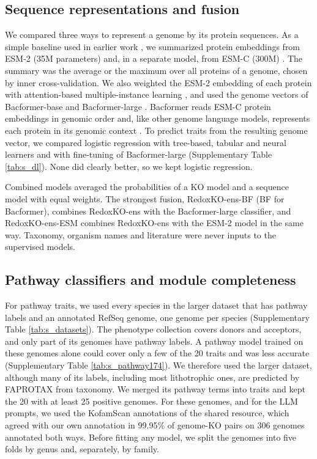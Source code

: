 \documentclass[10pt,a4paper,onecolumn]{article}
\begin{document}
\subsection{Sequence representations and
fusion}\label{sequence-representations-and-fusion}

We compared three ways to represent a genome by its protein sequences.
As a simple baseline used in earlier work \autocite{Hwang2024}, we
summarized protein embeddings from ESM-2 (35M parameters)
\autocite{Lin2023} and, in a separate model, from ESM-C (300M)
\autocite{EvolutionaryScale2024}. The summary was the average or the
maximum over all proteins of a genome, chosen by inner cross-validation.
We also weighted the ESM-2 embedding of each protein with
attention-based multiple-instance learning \autocite{Ilse2018}, and used
the genome vectors of Bacformer-base and Bacformer-large
\autocite{Wiatrak2025}. Bacformer reads ESM-C protein embeddings in
genomic order and, like other genome language models, represents each
protein in its genomic context \autocite{Hwang2024,Nguyen2024}. To
predict traits from the resulting genome vector, we compared logistic
regression with tree-based, tabular and neural learners and with
fine-tuning of Bacformer-large (Supplementary Table \ref{tab:s_dl}).
None did clearly better, so we kept logistic regression.

Combined models averaged the probabilities of a KO model and a sequence
model with equal weights. The strongest fusion, RedoxKO-ens-BF (BF for
Bacformer), combines RedoxKO-ens with the Bacformer-large classifier,
and RedoxKO-ens-ESM combines RedoxKO-ens with the ESM-2 model in the
same way. Taxonomy, organism names and literature were never inputs to
the supervised models.

\subsection{Pathway classifiers and module
completeness}\label{pathway-classifiers-and-module-completeness}

For pathway traits, we used every species in the larger dataset
\autocite{Madin2020} that has pathway labels and an annotated RefSeq
genome, one genome per species (Supplementary Table
\ref{tab:s_datasets}). The phenotype collection covers donors and
acceptors, and only part of its genomes have pathway labels. A pathway
model trained on these genomes alone could cover only a few of the 20
traits and was less accurate (Supplementary Table
\ref{tab:s_pathway174}). We therefore used the larger dataset, although
many of its labels, including most lithotrophic ones, are predicted by
FAPROTAX \autocite{Louca2016} from taxonomy. We merged its pathway terms
into traits and kept the 20 with at least 25 positive genomes. For these
genomes, and for the LLM prompts, we used the KofamScan annotations of
the shared resource, which agreed with our own annotation in 99.95\% of
genome-KO pairs on 306 genomes annotated both ways. Before fitting any
model, we split the genomes into five folds by genus and, separately, by
family.
\end{document}

